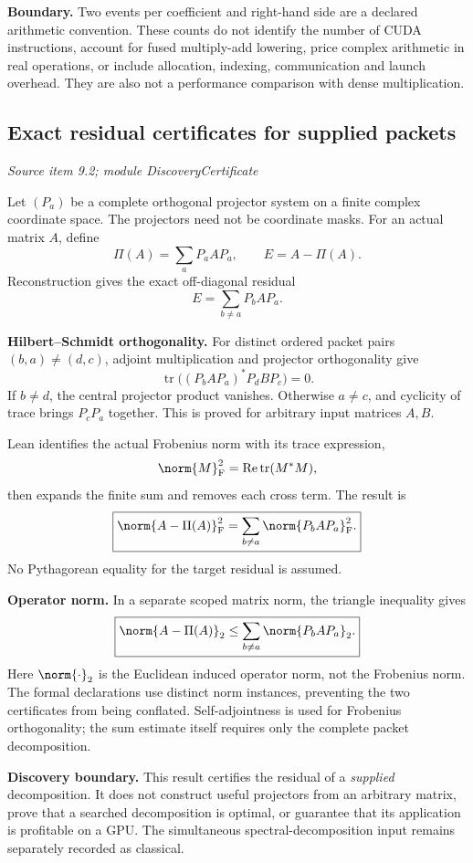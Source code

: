 \textbf{Boundary.} Two events per coefficient and right-hand side are a declared arithmetic convention. These counts do not identify the number of CUDA instructions, account for fused multiply-add lowering, price complex arithmetic in real operations, or include allocation, indexing, communication and launch overhead. They are also not a performance comparison with dense multiplication.



\subsection{Exact residual certificates for supplied packets}\label{supp5:subsection:005}\textit{Source item 9.2; module DiscoveryCertificate}\par
Let $(P_a)$ be a complete orthogonal projector system on a finite complex coordinate space. The projectors need not be coordinate masks. For an actual matrix $A$, define
\[
\Pi(A)=\sum_aP_aAP_a,
\qquad E=A-\Pi(A).
\]
Reconstruction gives the exact off-diagonal residual
\[
E=\sum_{b\ne a}P_bAP_a.
\]

\textbf{Hilbert--Schmidt orthogonality.} For distinct ordered packet pairs $(b,a)\ne(d,c)$, adjoint multiplication and projector orthogonality give
\[
\operatorname{tr}\bigl((P_bAP_a)^*P_dBP_c\bigr)=0.
\]
If $b\ne d$, the central projector product vanishes. Otherwise $a\ne c$, and cyclicity of trace brings $P_cP_a$ together. This is proved for arbitrary input matrices $A,B$.

Lean identifies the actual Frobenius norm with its trace expression,
\[
\norm{M}_{\rm F}^2=\operatorname{Re}\operatorname{tr}(M^*M),
\]
then expands the finite sum and removes each cross term. The result is
\[
\boxed{\norm{A-\Pi(A)}_{\rm F}^2
=\sum_{b\ne a}\norm{P_bAP_a}_{\rm F}^2.}
\]
No Pythagorean equality for the target residual is assumed.

\textbf{Operator norm.} In a separate scoped matrix norm, the triangle inequality gives
\[
\boxed{\norm{A-\Pi(A)}_2
\leq\sum_{b\ne a}\norm{P_bAP_a}_2.}
\]
Here $\norm{\cdot}_2$ is the Euclidean induced operator norm, not the Frobenius norm. The formal declarations use distinct norm instances, preventing the two certificates from being conflated. Self-adjointness is used for Frobenius orthogonality; the sum estimate itself requires only the complete packet decomposition.

\textbf{Discovery boundary.} This result certifies the residual of a \emph{supplied} decomposition. It does not construct useful projectors from an arbitrary matrix, prove that a searched decomposition is optimal, or guarantee that its application is profitable on a GPU. The simultaneous spectral-decomposition input remains separately recorded as classical.



